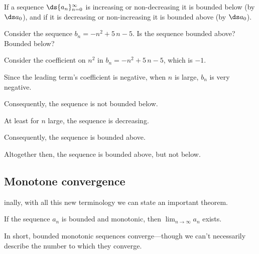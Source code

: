 \documentclass{ximera}
\begin{document}
If a sequence $\ds
\{a_n\}_{n=0}^\infty$ is increasing or non-decreasing it is bounded
below (by $\ds a_0$), and if it is decreasing or non-increasing it is
bounded above (by $\ds a_0$).

\begin{question}
  Consider the sequence \(b_{n} = -n^{2} + 5 \, n - 5\).  Is the sequence bounded above?  Bounded below?

    \begin{hint}
      Consider the coefficient on \(n^{2}\) in \(b_{n} = -n^{2} + 5 \, n - 5\), which is \(-1\).
    \end{hint}
    \begin{hint}
      Since the leading term's coefficient is negative, when \(n\) is large, \(b_{n}\) is very negative.
    \end{hint}
    \begin{hint}
      Consequently, the sequence is not bounded below.
    \end{hint}
    \begin{hint}
      At least for \(n\) large, the sequence is decreasing.
    \end{hint}
    \begin{hint}
      Consequently, the sequence is bounded above.
    \end{hint}
    \begin{hint}
      Altogether then, the sequence is bounded above, but not below.
    \end{hint}

    \begin{multipleChoice}
    \end{multipleChoice}

\end{question}


\subsection{Monotone convergence}

inally, with all this new terminology we can state an important
theorem.

\begin{theorem} If the sequence $a_n$ is bounded and monotonic, then
  $\lim_{n \to \infty} a_n$ exists.  \label{thm:bounded-monotonic}
\end{theorem}
In short, bounded monotonic sequences converge---though we can't
necessarily describe the number to which they converge.
\end{document}
